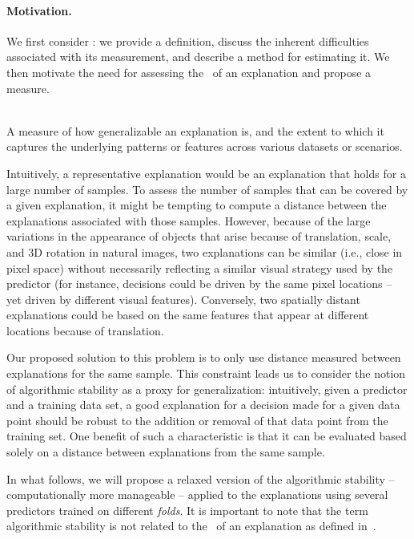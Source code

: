 \paragraph{Motivation.} We first consider \representativity: we provide a definition, discuss the inherent difficulties associated with its measurement, and describe a method for estimating it.
We then motivate the need for assessing the \consistency~of an explanation and propose a measure.

\begin{definition}{\representativity}\\
A measure of how generalizable an explanation is, and the extent to which it captures the underlying patterns or features across various datasets or scenarios. 
\label{def:mege:representativity}
\end{definition}

Intuitively, a representative explanation would be an explanation that holds for a large number of samples.
To assess the number of samples that can be covered by a given explanation, it might be tempting to compute a distance between the explanations associated with those samples. However,  because of the large variations in the appearance of objects that arise because of translation, scale, and 3D rotation in natural images, two explanations can be similar (i.e., close in pixel space) without necessarily reflecting a similar visual strategy used by the predictor (for instance, decisions could be driven by the same pixel locations -- yet driven by different visual features). Conversely, two spatially distant explanations could be based on the same features that appear at different locations because of translation. 

Our proposed solution to this problem is to only use distance measured between explanations for the same sample. This constraint leads us to consider the notion of algorithmic stability as a proxy for generalization: intuitively, given a predictor and a training data set, a good explanation for a decision made for a given data point should be robust to the addition or removal of that data point from the training set. One benefit of such a characteristic is that it can be evaluated based solely on a distance between explanations from the same sample.

In what follows, we will propose a relaxed version of the algorithmic stability -- computationally more manageable -- applied to the explanations using several predictors trained on different \textit{folds}.
It is important to note that the term algorithmic stability \cite{bousquet2002stability} is not related to the \stability~of an explanation as defined in~\cite{aggregating2020}.

